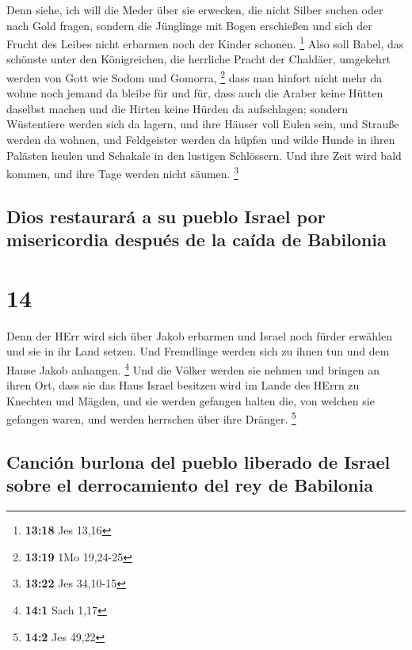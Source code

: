  Denn siehe, ich will die Meder über sie erwecken, die
nicht Silber suchen oder nach Gold fragen,  sondern die
Jünglinge mit Bogen erschießen und sich der Frucht des Leibes nicht
erbarmen noch der Kinder schonen. \footnote{\textbf{13:18} Jes 13,16}
 Also soll Babel, das schönste unter den Königreichen,
die herrliche Pracht der Chaldäer, umgekehrt werden von Gott wie Sodom
und Gomorra, \footnote{\textbf{13:19} 1Mo 19,24-25}  dass
man hinfort nicht mehr da wohne noch jemand da bleibe für und für, dass
auch die Araber keine Hütten daselbst machen und die Hirten keine Hürden
da aufschlagen;  sondern Wüstentiere werden sich da
lagern, und ihre Häuser voll Eulen sein, und Strauße werden da wohnen,
und Feldgeister werden da hüpfen  und wilde Hunde in
ihren Palästen heulen und Schakale in den lustigen Schlössern. Und ihre
Zeit wird bald kommen, und ihre Tage werden nicht säumen. \footnote{\textbf{13:22}
  Jes 34,10-15}

\hypertarget{dios-restauraruxe1-a-su-pueblo-israel-por-misericordia-despuuxe9s-de-la-cauxedda-de-babilonia}{%
\subsection{Dios restaurará a su pueblo Israel por misericordia después
de la caída de
Babilonia}\label{dios-restauraruxe1-a-su-pueblo-israel-por-misericordia-despuuxe9s-de-la-cauxedda-de-babilonia}}

\hypertarget{section-13}{%
\section{14}\label{section-13}}

 Denn der HErr wird sich über Jakob erbarmen und Israel
noch fürder erwählen und sie in ihr Land setzen. Und Fremdlinge werden
sich zu ihnen tun und dem Hause Jakob anhangen. \footnote{\textbf{14:1}
  Sach 1,17}  Und die Völker werden sie nehmen und bringen
an ihren Ort, dass sie das Haus Israel besitzen wird im Lande des HErrn
zu Knechten und Mägden, und sie werden gefangen halten die, von welchen
sie gefangen waren, und werden herrschen über ihre Dränger. \footnote{\textbf{14:2}
  Jes 49,22}

\hypertarget{canciuxf3n-burlona-del-pueblo-liberado-de-israel-sobre-el-derrocamiento-del-rey-de-babilonia}{%
\subsection{Canción burlona del pueblo liberado de Israel sobre el
derrocamiento del rey de
Babilonia}\label{canciuxf3n-burlona-del-pueblo-liberado-de-israel-sobre-el-derrocamiento-del-rey-de-babilonia}}

